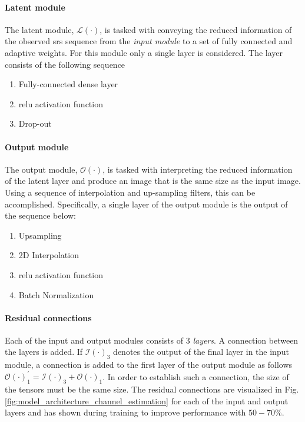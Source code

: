 \paragraph{Latent module}
The latent module, $\mathcal{L}(\cdot)$, is tasked with conveying the reduced information of the observed \gls{srs} sequence from the \textit{input module} to a set of fully connected and adaptive weights. For this module only a single layer is considered. The layer consists of the following sequence
\begin{enumerate}
    \item Fully-connected dense layer
    \item \gls{relu} activation function
    \item Drop-out
\end{enumerate}

\paragraph{Output module}
The output module, $\mathcal{O}(\cdot)$, is tasked with interpreting the reduced information of the latent layer and produce an image that is the same size as the input image. Using a sequence of interpolation and up-sampling filters, this can be accomplished. Specifically, a single layer of the output module is the output of the sequence below:

\begin{enumerate}
    \item Upsampling
    \item 2D Interpolation
    \item \gls{relu} activation function
    \item Batch Normalization
\end{enumerate}


\paragraph{Residual connections}
Each of the input and output modules consists of 3 \emph{layers}. A connection between the layers is added. If $\mathcal{I}(\cdot)_3$ denotes the output of the final layer in the input module, a connection is added to the first layer of the output module as follows $\mathcal{O}(\cdot)_{1}^{'} = \mathcal{I}(\cdot)_3  + \mathcal{O}(\cdot)_1$. In order to establish such a connection, the size of the tensors must be the same size. The residual connections are visualized in Fig. \ref{fig:model_architecture_channel_estimation} for each of the input and output layers and has shown during training to improve performance with $50-70\%$.

